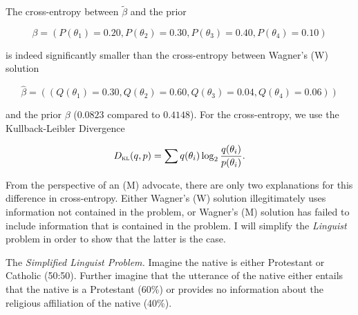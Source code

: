 \documentclass[12pt]{article}
\begin{document}

The cross-entropy between $\tilde{\beta}$ and the prior

\begin{equation}
  \label{eq:p14}
  \beta=(P(\theta_{1})=0.20,P(\theta_{2})=0.30,P(\theta_{3})=0.40,P(\theta_{4})=0.10)
\end{equation}

is indeed significantly smaller than the cross-entropy between
Wagner's (W) solution 

\begin{equation}
  \label{eq:p15}
  \hat{\beta}=((Q(\theta_{1})=0.30,Q(\theta_{2})=0.60,Q(\theta_{3})=0.04,Q(\theta_{4})=0.06))
\end{equation}

and the prior $\beta$ ($0.0823$ compared to $0.4148$). For the
cross-entropy, we use the Kullback-Leibler Divergence

\begin{equation}
  \label{eq:kl}
  D_{\textsc{kl}}(q,p)=\sum{}q(\theta_{i})\log_{2}\frac{q(\theta_{i})}{p(\theta_{i})}.
\end{equation}

From the perspective of an (M) advocate, there are only two
explanations for this difference in cross-entropy. Either Wagner's (W)
solution illegitimately uses information not contained in the problem,
or Wagner's (M) solution has failed to include information that is
contained in the problem. I will simplify the \emph{Linguist} problem
in order to show that the latter is the case.

\begin{quotex}
  The \emph{Simplified Linguist Problem.} Imagine the native is either
  Protestant or Catholic (50:50). Further imagine that the utterance
  of the native either entails that the native is a Protestant (60\%)
  or provides no information about the religious affiliation of the
  native (40\%).
\end{quotex}
\end{document}
